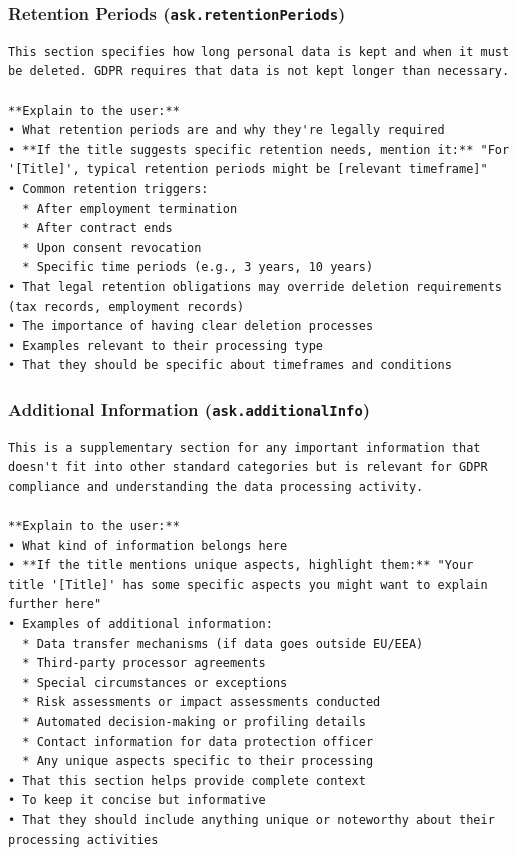 \subsubsection*{Retention Periods (\texttt{ask.retentionPeriods})}

\begin{lstlisting}
This section specifies how long personal data is kept and when it must be deleted. GDPR requires that data is not kept longer than necessary.

**Explain to the user:**
• What retention periods are and why they're legally required
• **If the title suggests specific retention needs, mention it:** "For '[Title]', typical retention periods might be [relevant timeframe]"
• Common retention triggers:
  * After employment termination
  * After contract ends
  * Upon consent revocation
  * Specific time periods (e.g., 3 years, 10 years)
• That legal retention obligations may override deletion requirements (tax records, employment records)
• The importance of having clear deletion processes
• Examples relevant to their processing type
• That they should be specific about timeframes and conditions
\end{lstlisting}

\subsubsection*{Additional Information (\texttt{ask.additionalInfo})}

\begin{lstlisting}
This is a supplementary section for any important information that doesn't fit into other standard categories but is relevant for GDPR compliance and understanding the data processing activity.

**Explain to the user:**
• What kind of information belongs here
• **If the title mentions unique aspects, highlight them:** "Your title '[Title]' has some specific aspects you might want to explain further here"
• Examples of additional information:
  * Data transfer mechanisms (if data goes outside EU/EEA)
  * Third-party processor agreements
  * Special circumstances or exceptions
  * Risk assessments or impact assessments conducted
  * Automated decision-making or profiling details
  * Contact information for data protection officer
  * Any unique aspects specific to their processing
• That this section helps provide complete context
• To keep it concise but informative
• That they should include anything unique or noteworthy about their processing activities
\end{lstlisting}

